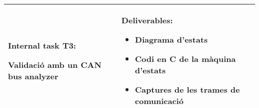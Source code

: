 \begin{center}
\begin{tabular}{| p{8.5cm} | p{5.25cm} |}
            \textbf{Internal task T3:}
                \newline \hspace*{0.3cm}
                \begin{minipage}[t]{8cm}
                    Validació amb un CAN bus analyzer
                \end{minipage}
                \smallskip
            & 
            \textbf{ Deliverables: }
                \begin{itemize}
                    \item { Diagrama d’estats }
                    \item { Codi en C de la màquina d’estats }
                    \item { Captures de les trames de comunicació }
                \end{itemize} \\
        \hline
    \end{tabular}
\end{center}



